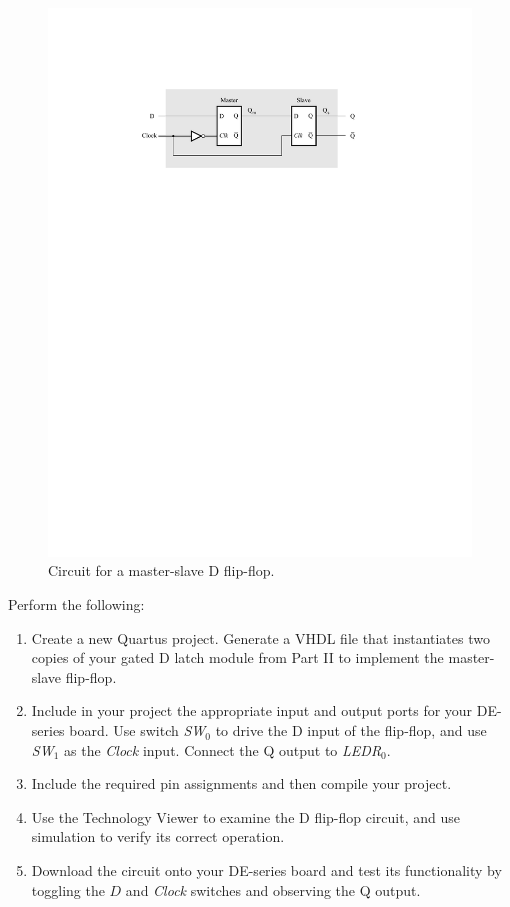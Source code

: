 \documentclass[epsfig,10pt,fullpage]{article}
\begin{document}
\begin{figure}[H]
	\begin{center}
		\includegraphics[]{figures/figure5.pdf}
	\end{center}
	\caption{Circuit for a master-slave D flip-flop.}
\label{fig:MS_FF}
\end{figure}

Perform the following:
\begin{enumerate}
\item Create a new Quartus project. Generate a VHDL file that instantiates two
copies of your gated D latch module from Part II to implement the master-slave flip-flop.
\item Include in your project the appropriate input and output ports for your 
DE-series board. Use switch {\it SW}$_0$ to drive the D input of the flip-flop,
and use {\it SW}$_1$ as the {\it Clock} input. Connect the Q output to {\it LEDR}$_{0}$.
\item
Include the required pin assignments and then compile your project.
\item Use the Technology Viewer to examine the D flip-flop circuit, and use
simulation to verify its correct operation.
\item
Download the circuit onto your DE-series board and test its functionality 
by toggling the $D$ and {\it Clock} switches and observing the Q output.
\end{enumerate}
\end{document}

